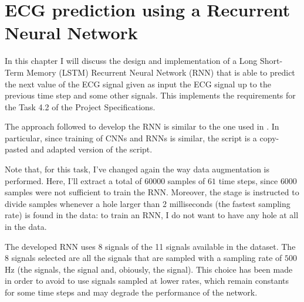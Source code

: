 \chapter{ECG prediction using a Recurrent Neural Network}\label{ch:rnn}

In this chapter I will discuss the design and implementation of a Long
Short-Term Memory (LSTM) Recurrent Neural Network (RNN) that is able to predict
the next value of the ECG signal given as input the ECG signal up to the
previous time step and some other signals. This implements the requirements for
the Task 4.2 of the Project Specifications.

The approach followed to develop the RNN is similar to the one used in
. In particular, since training of CNNs and RNNs is similar, the
script  is a copy-pasted and adapted version of the
 script.

Note that, for this task, I've changed again the way data augmentation is
performed. Here, I'll extract a total of \(60000\) samples of \(61\) time
steps, since \(6000\) samples were not sufficient to train the RNN. Moreover,
the  stage is instructed to divide samples whenever a hole larger
than 2 milliseconds (the fastest sampling rate) is found in the data: to train
an RNN, I do not want to have any hole at all in the data.

The developed RNN uses 8 signals of the 11 signals available in the dataset.
The 8 signals selected are all the signals that are sampled with a sampling
rate of \(500\) Hz (the  signals, the  signal
and, obiously, the  signal). This choice has been made in order to
avoid to use signals sampled at lower rates, which remain constants for some
time steps and may degrade the performance of the network.






